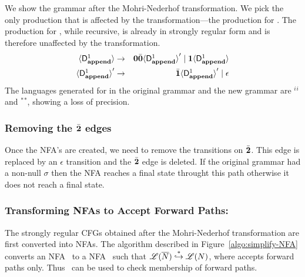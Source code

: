 \documentclass[9pt]{sigplanconf}
\newcommand{\comment}[1]{{\color{Myblue}{(#1)}}}
\begin{document}
We show the  grammar after the Mohri-Nederhof
transformation. We  pick the only production that  is affected by
the transformation---the production for .  The
production for , while  recursive, is already in
strongly  regular  form  and   is  therefore  unaffected  by  the
transformation.
 \begin{eqnarray*}
  \var{\Df{\append}{1}}
  &\rightarrow&               \acar\bcar \var{\Df{\append}{1}}'  \mid
  \acdr\var{\Df{\append}{1}} \\
\var{\Df{\append}{1}}'  &\rightarrow&   \bcdr\var{\Df{\append}{1}}'
\mid \epsilon
\end{eqnarray*}
The  languages
generated for   in  the original grammar  and the
new       grammar      are       \acdr$^i$\acar\bcar\bcdr$^i$      and
\acdr$^*$\acar\bcar\bcdr$^*$, showing a  loss of  precision.

\subsubsection{Removing the $\bar{\mathbf{2}}$ edges}
Once the NFA's are created, we need to remove the transitions on
$\bar{\mathbf{2}}$. This edge is replaced by an $\epsilon$ transition and the
$\bar{\mathbf{2}}$ edge is deleted. If the original grammar had a non-null
$\sigma$ then the NFA reaches a final state throught this path
otherwise it does not reach a final state.\comment{Need to rewrite
this}
\subsubsection{Transforming NFAs to Accept Forward Paths:}
The strongly regular CFGs obtained after the Mohri-Nederhof
transformation are
  first converted  into  NFAs.  The        algorithm         described
      in
Figure~\ref{algo:simplify-NFA} converts  an NFA \ntbar\  to a NFA
\nt\ such that  $\mathscr{L}({\overline{N}}) \stackrel{*}{\hookrightarrow}
\mathscr{L}({N})$, where {\nt} accepts forward paths only.
\comment{Rewrite the algorithm to handle \cbar and update the example
automata}
Thus  \nt\  can  be  used  to  check
membership of forward paths.
\end{document}
